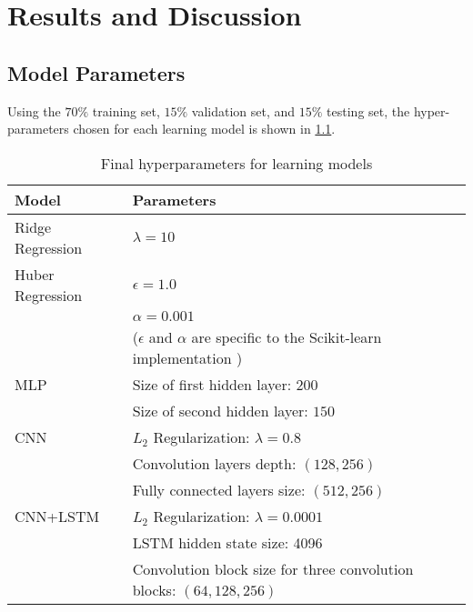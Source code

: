 \chapter{Results and Discussion} \label{chapter:results}

\section{Model Parameters}

Using the $70\%$ training set, $15\%$ validation set, and $15\%$ testing set, the hyper-parameters chosen for each learning model is shown in \cref{tab:hyperparam}.

\begin{table}[h]
	\centering
	\caption{Final hyperparameters for learning models}
	\label{tab:hyperparam}
	\begin{tabular}{@{}ll}
		\toprule
		Model                & Parameters                                                                                    \\ \midrule
		Ridge Regression     & $\lambda=10$                                                                                  \\ \midrule
		Huber Regression     & $\epsilon = 1.0$                                                                              \\
		                     & $\alpha=0.001$                                                                                \\
		                     & ($\epsilon$ and $\alpha$ are specific to the Scikit-learn implementation \cite{scikit-learn}) \\\midrule
		\acs{MLP}            & Size of first hidden layer: $200$                                                             \\
		                     & Size of second hidden layer: $150$                                                            \\ \midrule
		\acs{CNN}            & $L_2$ Regularization: $\lambda=0.8$                                                           \\
		                     & Convolution layers depth: $(128, 256)$                                                        \\
		                     & Fully connected layers size: $(512, 256)$                                                     \\ \midrule
		\acs{CNN}+\acs{LSTM} & $L_2$ Regularization: $\lambda=0.0001$                                                             \\
		                     & \acs{LSTM} hidden state size: 4096                                                            \\
		                     & Convolution block size for three convolution blocks: $(64, 128, 256)$                         \\ \bottomrule
	\end{tabular}
\end{table}

